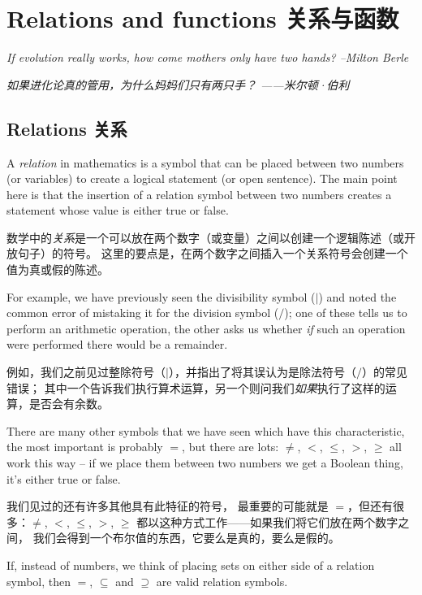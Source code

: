 \chapter{Relations and functions 关系与函数}
\label{ch:rel}

{\em If evolution really works, how come mothers only have two hands?
--Milton Berle}

{\em 如果进化论真的管用，为什么妈妈们只有两只手？
——米尔顿·伯利}



\section{Relations 关系}
\label{sec:rels}

A \emph{relation} in mathematics is a symbol that can be placed between
two numbers (or variables) to create a logical statement (or open sentence).
The main point here is that the insertion of a relation symbol between 
two numbers creates a statement whose value is either true or false.

数学中的\emph{关系}是一个可以放在两个数字（或变量）之间以创建一个逻辑陈述（或开放句子）的符号。
这里的要点是，在两个数字之间插入一个关系符号会创建一个值为真或假的陈述。

For example, we have previously seen the divisibility symbol ($\mid$) and noted
the common error of mistaking it for the division symbol ($/$);
one of these
tells us to perform an arithmetic operation, the other asks us whether 
\emph{if} such an operation were performed there would be a remainder.

例如，我们之前见过整除符号（$\mid$），并指出了将其误认为是除法符号（$/$）的常见错误；
其中一个告诉我们执行算术运算，另一个则问我们\emph{如果}执行了这样的运算，是否会有余数。

There are many other symbols that we have seen which have this characteristic,
the most important is probably $=$, but there are lots: $\neq$, $<$, $\leq$, 
$>$, $\geq$ all work this way -- if we place them between two numbers
we get a Boolean thing, it's either true or false.

我们见过的还有许多其他具有此特征的符号，
最重要的可能就是 $=$，但还有很多：$\neq$, $<$, $\leq$, 
$>$, $\geq$ 都以这种方式工作——如果我们将它们放在两个数字之间，
我们会得到一个布尔值的东西，它要么是真的，要么是假的。

If, instead of numbers, 
we think of placing sets on either side of a relation symbol, then
 $=$, $\subseteq$  and $\supseteq$ are valid relation symbols.

